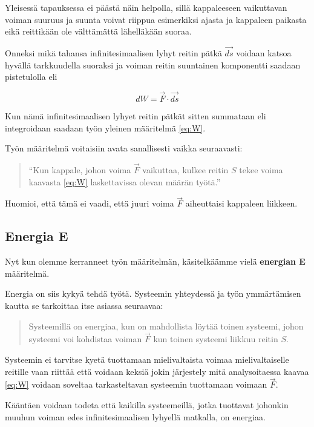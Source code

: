 \documentclass[12pt,a4paper,finnish]{book}
\begin{document}
Yleisessä tapauksessa ei päästä näin helpolla, sillä kappaleeseen vaikuttavan voiman suuruus ja suunta voivat 
riippua esimerkiksi ajasta ja kappaleen paikasta eikä reittikään ole välttämättä lähelläkään suoraa. 

Onneksi 
mikä tahansa infinitesimaalisen lyhyt reitin pätkä $\vec{ds}$ voidaan katsoa hyvällä tarkkuudella suoraksi ja 
voiman reitin suuntainen komponentti saadaan pistetulolla eli

\begin{equation}
 dW = \vec{F} \cdot \vec{ds}
\end{equation}

Kun nämä infinitesimaalisen lyhyet reitin pätkät sitten summataan eli integroidaan saadaan työn yleinen määritelmä 
\ref{eq:W}.

Työn määritelmä voitaisiin avata sanallisesti vaikka seuraavasti:

\begin{quotation}
``Kun kappale, johon voima $\vec{F}$ vaikuttaa, kulkee 
reitin $S$ tekee voima kaavasta \ref{eq:W} laskettavissa olevan määrän työtä.''
\end{quotation}

 Huomioi, että tämä ei vaadi, että 
juuri voima $\vec{F}$ aiheuttaisi kappaleen liikkeen.

\subsection{Energia E}

Nyt kun olemme kerranneet työn määritelmän, käsitelkäämme vielä \textbf{energian E} määritelmä. 

Energia on siis kykyä tehdä työtä. Systeemin yhteydessä ja työn ymmärtämisen kautta se tarkoittaa itse 
asiassa seuraavaa:

\begin{quotation}
 Systeemillä on energiaa, kun on mahdollista löytää toinen systeemi, johon systeemi voi kohdistaa 
 voiman $\vec{F}$ kun toinen systeemi liikkuu reitin $S$.
\end{quotation}

Systeemin ei tarvitse kyetä tuottamaan mielivaltaista voimaa mielivaltaiselle reitille vaan riittää että 
voidaan keksiä jokin järjestely mitä analysoitaessa kaavaa \ref{eq:W} voidaan soveltaa tarkasteltavan 
systeemin tuottamaan voimaan $\vec{F}$.

Kääntäen voidaan todeta että kaikilla systeemeillä, jotka tuottavat johonkin muuhun voiman edes 
infinitesimaalisen lyhyellä matkalla, on energiaa.
\end{document}
